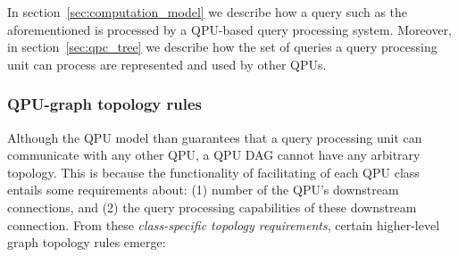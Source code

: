 In section~\ref{sec:computation_model} we describe how a query such as the aforementioned is processed by a QPU-based
query processing system.
Moreover, in section~\ref{sec:qpc_tree} we describe how the set of queries a query processing unit can process are
represented and used by other QPUs.

\subsubsection{QPU-graph topology rules}
\label{sec:graph_topology}
Although the QPU model than guarantees that a query processing unit can communicate with any other QPU,
a QPU DAG cannot have any arbitrary topology.
This is because the functionality of facilitating of each QPU class entails some requirements about:
(1) number of the QPU's downstream connections, and (2) the query processing capabilities of these downstream connection.
From these \textit{class-specific topology requirements}, certain higher-level graph topology rules emerge:
